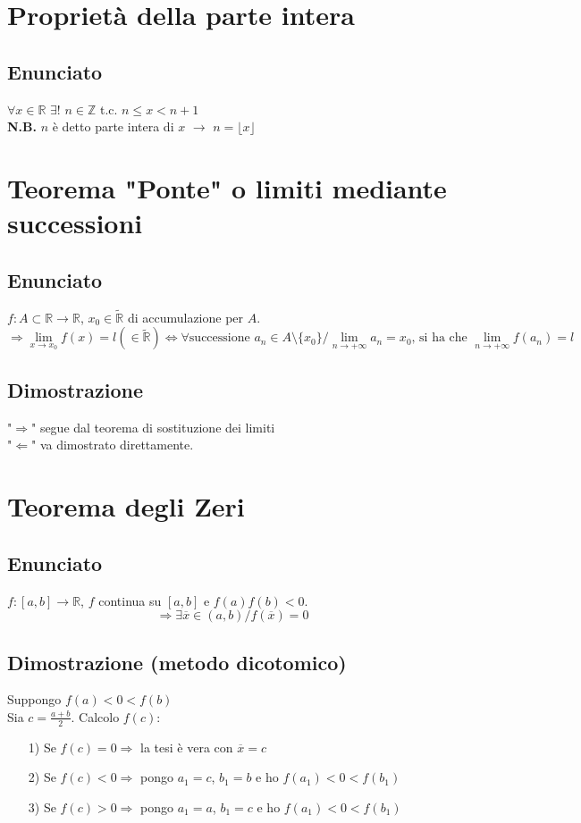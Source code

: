 \documentclass{article}
\newcommand{\R}{\mathbb{R}}
\newcommand{\Z}{\mathbb{Z}}
\newcommand{\Rext}{\widetilde{\mathbb{R}}}
\begin{document}
\begin{flushleft}
\section{Proprietà della parte intera}
\subsection{Enunciato}
$\forall x \in \R$ $\exists !$ $ n \in \Z$ t.c. $ n \leq x < n + 1$\\
\textbf{N.B.} $n$ è detto parte intera di $x$ $\rightarrow$ $n = \lfloor x \rfloor$

\section{Teorema "Ponte" o limiti mediante successioni}
\subsection{Enunciato}
$f:A \subset \R \rightarrow \R$, $x_0 \in \Rext$ di accumulazione per $A$.\\
\[
\Rightarrow \lim\limits_{x \to x_0}f(x) = l(\in \Rext) \iff \forall \text{successione } a_n \in A \setminus \{x_0\}/\lim\limits_{n \to + \infty}a_n = x_0 \text{, si ha che } \lim\limits_{n \to + \infty} f(a_n)=l
\]
\subsection{Dimostrazione}
"$\Rightarrow$" segue dal teorema di sostituzione dei limiti\\
"$\Leftarrow$" va dimostrato direttamente.

\section{Teorema degli Zeri}
\subsection{Enunciato}
$f:[a, b] \rightarrow \R$, $f$ continua su $[a, b]$ e $f(a)f(b) <0$.
\[
\Rightarrow \exists \overline{x} \in (a,b) / f(\overline{x}) = 0
\]
\subsection{Dimostrazione (metodo dicotomico)}
Suppongo $f(a) < 0 < f(b)$\\
Sia $c=\frac{a+b}{2}$. Calcolo $f(c)$:\\
\begin{enumerate}
    \item[1)] Se $f(c) = 0 \Rightarrow$ la tesi è vera con $\overline{x} = c$ \\
    \item[2)] Se $f(c) < 0 \Rightarrow$ pongo $a_1 = c$, $b_1 = b$ e ho $f(a_1) < 0 < f(b_1)$ \\
    \item[3)] Se $f(c) > 0 \Rightarrow$ pongo $a_1 = a$, $b_1 = c$ e ho $f(a_1) < 0 < f(b_1)$ 
\end{enumerate}


\end{flushleft}
\end{document}
